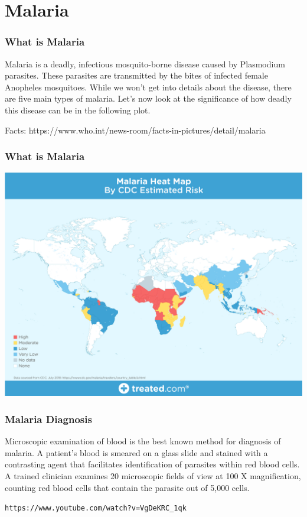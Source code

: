 \section{Malaria}

\begin{frame}[fragile]
  \frametitle{What is Malaria}
  Malaria is a deadly, infectious mosquito-borne disease caused by Plasmodium parasites. These parasites are transmitted by the bites of infected female Anopheles mosquitoes. While we won’t get into details about the disease, there are five main types of malaria. Let’s now look at the significance of how deadly this disease can be in the following plot.\\

  \vspace{3mm}

  Facts: https://www.who.int/news-room/facts-in-pictures/detail/malaria

\end{frame}

\begin{frame}[fragile]
  \frametitle{What is Malaria}
  \includegraphics[scale=0.18]{img/malaria_heatmap}
\end{frame}


\begin{frame}[fragile]
  \frametitle{Malaria Diagnosis}
  Microscopic examination of blood is the best known method for diagnosis of malaria. A patient’s blood is smeared on a glass slide and stained with a contrasting agent that facilitates identification of parasites within red blood cells. A trained clinician examines 20 microscopic fields of view at 100 X magnification, counting red blood cells that contain the parasite out of 5,000 cells.\\

  \vspace{3mm}

  \verb|https://www.youtube.com/watch?v=VgDeKRC_1qk|
\end{frame}

